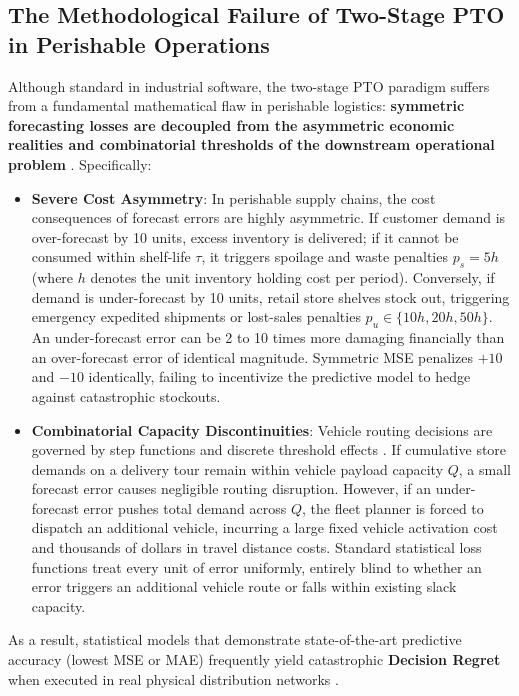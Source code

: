 \documentclass[11pt,a4paper]{article}
\theoremstyle{definition}
\theoremstyle{remark}
\begin{document}
\subsection{The Methodological Failure of Two-Stage PTO in Perishable Operations}
Although standard in industrial software, the two-stage PTO paradigm suffers from a fundamental mathematical flaw in perishable logistics: \textbf{symmetric forecasting losses are decoupled from the asymmetric economic realities and combinatorial thresholds of the downstream operational problem} \citep{elmachtoub2022smart,sadana2025survey}. Specifically:
\begin{itemize}[leftmargin=*]
    \item \textbf{Severe Cost Asymmetry}: In perishable supply chains, the cost consequences of forecast errors are highly asymmetric. If customer demand is over-forecast by 10 units, excess inventory is delivered; if it cannot be consumed within shelf-life $\tau$, it triggers spoilage and waste penalties $p_s = 5h$ (where $h$ denotes the unit inventory holding cost per period). Conversely, if demand is under-forecast by 10 units, retail store shelves stock out, triggering emergency expedited shipments or lost-sales penalties $p_u \in \{10h, 20h, 50h\}$. An under-forecast error can be 2 to 10 times more damaging financially than an over-forecast error of identical magnitude. Symmetric MSE penalizes $+10$ and $-10$ identically, failing to incentivize the predictive model to hedge against catastrophic stockouts.
    \item \textbf{Combinatorial Capacity Discontinuities}: Vehicle routing decisions are governed by step functions and discrete threshold effects \citep{solomon1987algorithms,miller1960integer}. If cumulative store demands on a delivery tour remain within vehicle payload capacity $Q$, a small forecast error causes negligible routing disruption. However, if an under-forecast error pushes total demand across $Q$, the fleet planner is forced to dispatch an additional vehicle, incurring a large fixed vehicle activation cost and thousands of dollars in travel distance costs. Standard statistical loss functions treat every unit of error uniformly, entirely blind to whether an error triggers an additional vehicle route or falls within existing slack capacity.
\end{itemize}

As a result, statistical models that demonstrate state-of-the-art predictive accuracy (lowest MSE or MAE) frequently yield catastrophic \textbf{Decision Regret} when executed in real physical distribution networks \citep{bertsimas2020predictive,ban2019big}.
\end{document}
